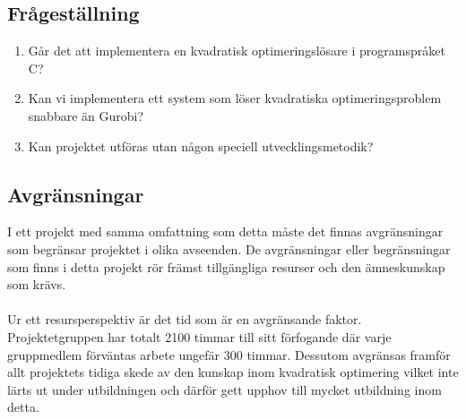 \subsection{Frågeställning}
	\begin{enumerate}
		\item Går det att implementera en kvadratisk optimeringslösare i programspråket C?
		\item Kan vi implementera ett system som löser kvadratiska optimeringsproblem snabbare än Gurobi?
		\item Kan projektet utföras utan någon speciell utvecklingsmetodik? 
	\end{enumerate}

\subsection{Avgränsningar}
I ett projekt med samma omfattning som detta måste det finnas avgränsningar som begränsar projektet i olika avseenden. De avgränsningar eller begränsningar som finns i detta projekt rör främst tillgängliga resurser och den ämneskunskap som krävs.
\\ \\
Ur ett resursperspektiv är det tid som är en avgränsande faktor. Projektetgruppen har totalt 2100 timmar till sitt förfogande där varje gruppmedlem förväntas arbete ungefär 300 timmar. Dessutom avgränsas framför allt projektets tidiga skede av den kunskap inom kvadratisk optimering vilket inte lärts ut under utbildningen och därför gett upphov till mycket utbildning inom detta.